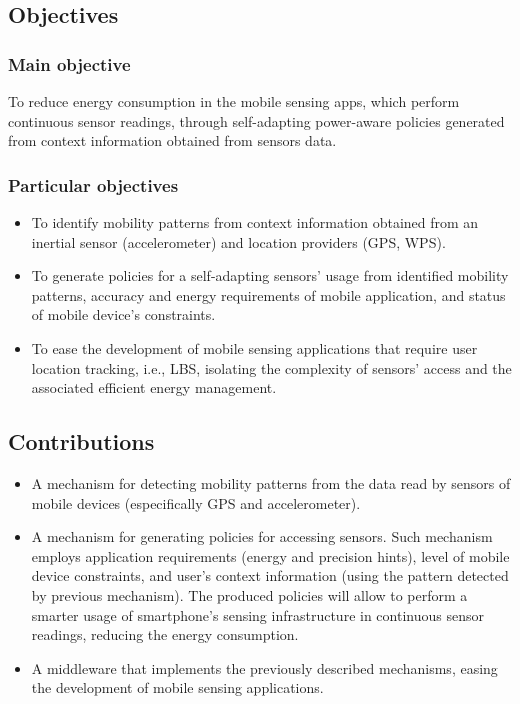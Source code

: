 \documentclass[ENG,PhD]{cinvestav}
\begin{document}
\subsection{Objectives} 
\label{sub:objectives}

\subsubsection*{Main objective}
\label{ssub:main_objective}
To reduce energy consumption in the mobile sensing apps, which perform continuous sensor readings, through self-adapting power-aware policies generated from context information obtained from sensors data.

\subsubsection*{Particular objectives} 
\label{ssub:particular_objectives}
\begin{itemize}
  \item To identify mobility patterns from context information obtained from an inertial sensor (accelerometer) and location providers (GPS, WPS).
  \item To generate policies for a self-adapting sensors' usage from identified mobility patterns, accuracy and energy requirements of mobile application, and status of mobile device's constraints. 
  \item To ease the development of mobile sensing applications that require user location tracking, i.e., LBS, isolating the complexity of sensors' access and the associated efficient energy management.
\end{itemize}


\subsection{Contributions} 
\label{sub:contributions}

\begin{itemize}
  \item A mechanism for detecting mobility patterns from the data read by sensors of mobile devices (especifically GPS and accelerometer).
  \item A mechanism for generating policies for accessing sensors.
  Such mechanism employs application requirements (energy and precision hints), level of mobile device constraints, and user's context information (using the pattern detected by previous mechanism).
  The produced policies will allow to perform a smarter usage of smartphone's sensing infrastructure in continuous sensor readings, reducing the energy consumption.
  \item A middleware that implements the previously described mechanisms, easing the development of mobile sensing applications.
\end{itemize}
\end{document}
